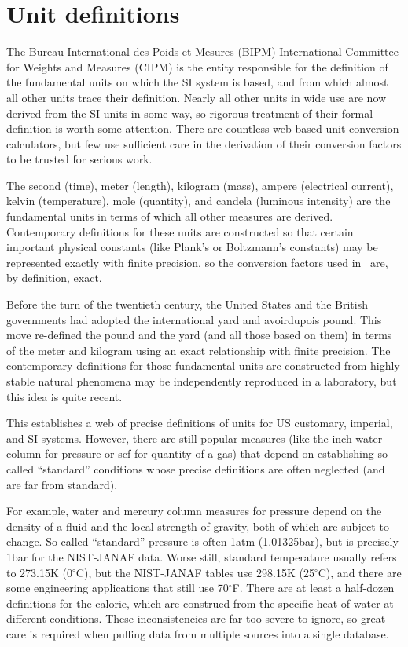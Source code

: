 \section{Unit definitions}\label{sec:units:def}

The Bureau International des Poids et Mesures (BIPM) International Committee for Weights and Measures (CIPM) is the entity responsible for the definition of the fundamental units on which the SI system is based, and from which almost all other units trace their definition.  Nearly all other units in wide use are now derived from the SI units in some way, so rigorous treatment of their formal definition is worth some attention.  There are countless web-based unit conversion calculators, but few use sufficient care in the derivation of their conversion factors to be trusted for serious work.

The second (time), meter (length), kilogram (mass), ampere (electrical current), kelvin (temperature), mole (quantity), and candela (luminous intensity) are the fundamental units in terms of which all other measures are derived.  Contemporary definitions for these units are constructed so that certain important physical constants (like Plank's or Boltzmann's constants) may be represented exactly with finite precision, so the conversion factors used in \PM\ are, by definition, exact.

Before the turn of the twentieth century, the United States and the British governments had adopted the international yard and avoirdupois pound.  This move re-defined the pound and the yard (and all those based on them) in terms of the meter and kilogram using an exact relationship with finite precision.  The contemporary definitions for those fundamental units are constructed from highly stable natural phenomena may be independently reproduced in a laboratory, but this idea is quite recent.  \cite{nbs:sp447}

This establishes a web of precise definitions of units for US customary, imperial, and SI systems.  However, there are still popular measures (like the inch water column for pressure or scf for quantity of a gas) that depend on establishing so-called ``standard'' conditions whose precise definitions are often neglected (and are far from standard).  

For example, water and mercury column measures for pressure depend on the density of a fluid and the local strength of gravity, both of which are subject to change.  So-called ``standard'' pressure is often 1atm (1.01325bar), but is precisely 1bar for the NIST-JANAF data.  Worse still, standard temperature usually refers to 273.15K (0$^\circ$C), but the NIST-JANAF tables use 298.15K (25$^\circ$C), and there are some engineering applications that still use 70$^\circ$F.  There are at least a half-dozen definitions for the calorie, which are construed from the specific heat of water at different conditions.  These inconsistencies are far too severe to ignore, so great care is required when pulling data from multiple sources into a single database.

